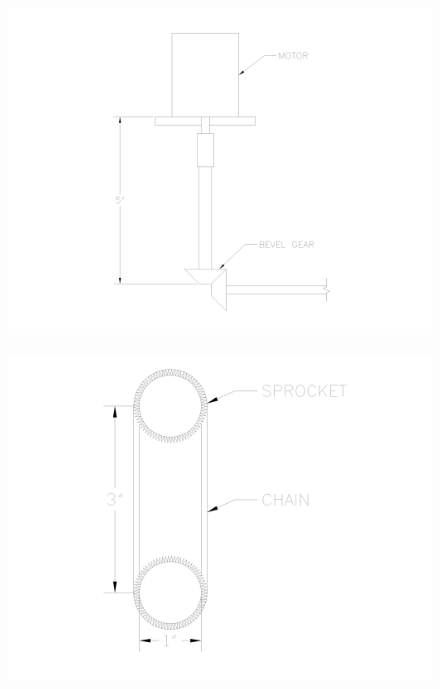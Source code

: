 \documentclass[11pt]{article}
\begin{document}
\begin{figure}[H]
\centering
\begin{minipage}{.5\textwidth}
  \centering
  \includegraphics[width=\linewidth]{res/bevel_gear.png}
  \label{fig:bevel gear}
\end{minipage}%
\begin{minipage}{.5\textwidth}
  \centering
  \includegraphics[width=\linewidth]{res/sprocket_and_chain.png}
  \label{fig:sprocket and chain}
\end{minipage}
\end{figure}
\end{document}

